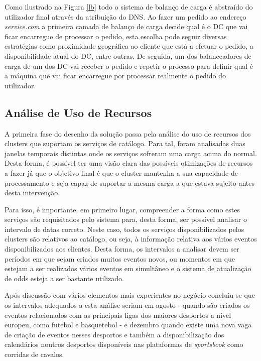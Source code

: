 Como ilustrado na Figura \ref{lb} todo o sistema de balanço de carga é abstraído do utilizador
final através da atribuição do \ac{DNS}. Ao fazer um pedido ao endereço \textit{service.com} a primeira
camada de balanço de carga decide qual é o \ac{DC} que vai ficar encarregue de processar o pedido,
esta escolha pode seguir diversas estratégias como proximidade geográfica ao cliente que está a 
efetuar o pedido, a disponibilidade atual do \ac{DC}, entre outras. De seguida, um dos 
balanceadores de carga de um dos \ac{DC} vai receber o pedido e repetir o processo para definir
qual é a máquina que vai ficar encarregue por processar realmente o pedido do utilizador.

\subsection{Análise de Uso de Recursos}

A primeira fase do desenho da solução passa pela análise do uso de recursos dos \glspl{cluster}
que suportam os serviços de catálogo. Para tal, foram analisadas duas janelas temporais distintas
onde os serviços sofreram uma carga acima do normal. Desta forma, é possível ter uma visão clara
das possíveis otimizações de recursos a fazer já que o objetivo final é que o \gls{cluster}
mantenha a sua capacidade de processamento e seja capaz de suportar a mesma carga a que estava
sujeito antes desta intervenção.

Para isso, é importante, em primeiro lugar, compreender a forma como estes serviços são requisitados
pelo sistema para, desta forma, ser possível analisar o intervalo de datas correto. Neste caso,
todos os serviços disponibilizados pelos \glspl{cluster} são relativos ao catálogo, ou seja,
à informação relativa aos vários eventos disponibilizados aos clientes. Desta forma, os intervalos
a analisar devem ser períodos em que sejam criados muitos eventos novos, ou momentos em que
estejam a ser realizados vários eventos em simultâneo e o sistema de atualização de \glspl{odd}
esteja a ser bastante utilizado.

Após discussão com vários elementos mais experientes no negócio concluiu-se que os intervalos
adequados a esta análise seriam em agosto - quando são criados os eventos relacionados com as
principais ligas dos maiores desportos a nível europeu, como futebol e basquetebol - e dezembro 
quando existe uma nova vaga de criação de eventos nesses desportos e também a disponibilização 
dos calendários noutros desportos disponíveis nas plataformas de \textit{sportsbook} como
corridas de cavalos.

